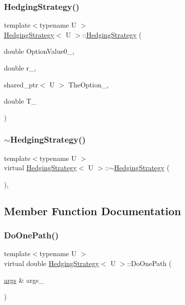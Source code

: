 \subsubsection{\texorpdfstring{Hedging\+Strategy()}{HedgingStrategy()}}
{\footnotesize\ttfamily template$<$typename U $>$ \\
\hyperlink{classHedgingStrategy}{Hedging\+Strategy}$<$ U $>$\+::\hyperlink{classHedgingStrategy}{Hedging\+Strategy} (\begin{DoxyParamCaption}\item[{double}]{Option\+Value0\+\_\+,  }\item[{double}]{r\+\_\+,  }\item[{shared\+\_\+ptr$<$ U $>$}]{The\+Option\+\_\+,  }\item[{double}]{T\+\_\+ }\end{DoxyParamCaption})}

\hypertarget{classHedgingStrategy_a799ea631e5b22c0c3579495596aec59c}{}\label{classHedgingStrategy_a799ea631e5b22c0c3579495596aec59c} 
\subsubsection{\texorpdfstring{$\sim$\+Hedging\+Strategy()}{~HedgingStrategy()}}
{\footnotesize\ttfamily template$<$typename U $>$ \\
virtual \hyperlink{classHedgingStrategy}{Hedging\+Strategy}$<$ U $>$\+::$\sim$\hyperlink{classHedgingStrategy}{Hedging\+Strategy} (\begin{DoxyParamCaption}{ }\end{DoxyParamCaption})\hspace{0.3cm}{\ttfamily [inline]}, {\ttfamily [virtual]}}



\subsection{Member Function Documentation}
\hypertarget{classHedgingStrategy_ad2a7c02ee59750c40f29a03ee6fee140}{}\label{classHedgingStrategy_ad2a7c02ee59750c40f29a03ee6fee140} 
\subsubsection{\texorpdfstring{Do\+One\+Path()}{DoOnePath()}}
{\footnotesize\ttfamily template$<$typename U $>$ \\
virtual double \hyperlink{classHedgingStrategy}{Hedging\+Strategy}$<$ U $>$\+::Do\+One\+Path (\begin{DoxyParamCaption}\item[{\hyperlink{path__generation_8h_a75c13cde2074f502cc4348c70528572d}{args} \&}]{args\+\_\+ }\end{DoxyParamCaption})\hspace{0.3cm}{\ttfamily [pure virtual]}}



